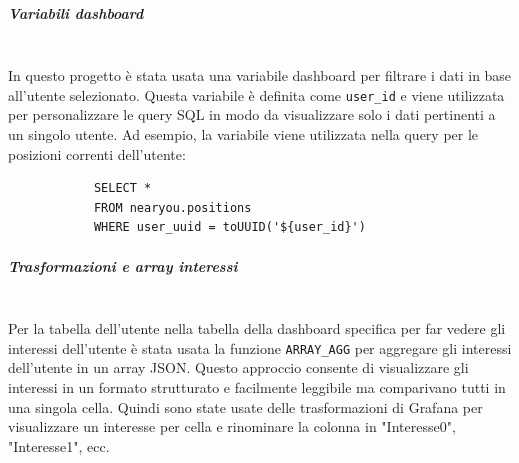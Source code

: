 \documentclass[10pt]{article}
\newcommand{\mysubparagraph}[1]{\subparagraph{#1}\mbox{}\\}
\begin{document}
        \mysubparagraph{Variabili dashboard}
        In questo progetto è stata usata una variabile dashboard per filtrare i dati in base all'utente selezionato.
        Questa variabile è definita come \texttt{user\_id} e viene utilizzata per personalizzare le query SQL in modo da visualizzare solo i dati pertinenti a un singolo utente.
        Ad esempio, la variabile viene utilizzata nella query per le posizioni correnti dell'utente:
        \begin{lstlisting}
            SELECT * 
            FROM nearyou.positions 
            WHERE user_uuid = toUUID('${user_id}')
        \end{lstlisting} 

        \mysubparagraph{Trasformazioni e array interessi}
        Per la tabella dell'utente nella tabella della dashboard specifica per far vedere gli interessi dell'utente è stata usata la funzione \texttt{ARRAY\_AGG} per aggregare gli interessi dell'utente in un array JSON.
        Questo approccio consente di visualizzare gli interessi in un formato strutturato e facilmente leggibile ma comparivano tutti in una singola cella.
        Quindi sono state usate delle trasformazioni di Grafana per visualizzare un interesse per cella e rinominare la colonna in "Interesse0", "Interesse1", ecc.
\end{document}
